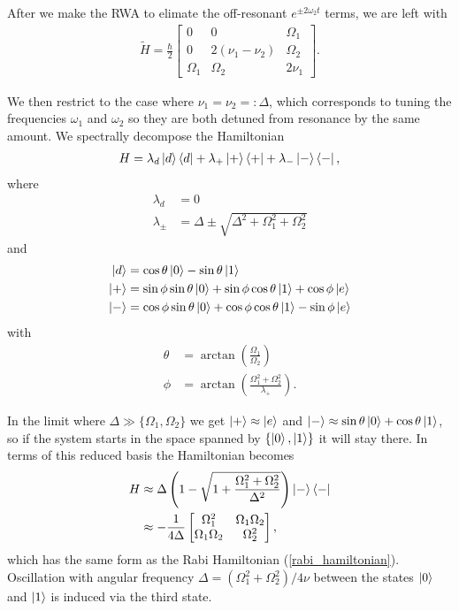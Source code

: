 After we make the RWA to elimate the off-resonant $e^{\pm2\omega_2 t}$ terms, we are left with 
\begin{align}
  \tilde{H}=\frac{\hbar}{2}
  \begin{bmatrix}
    0 & 0 & \Omega_1 \\
    0 & 2(\nu_1 - \nu_2) & \Omega_2  \\
    \Omega_1 & \Omega_2  & 2\nu_1
  \end{bmatrix}.
\end{align}

We then restrict to the case where $\nu_1 = \nu_2 =: \Delta$, which corresponds to tuning the frequencies $\omega_1$ and $\omega_2$ so they are both detuned from resonance by the same amount. We spectrally decompose the Hamiltonian
\begin{align}
  H = \lambda_d \left\vert d\right\rangle\left\langle d\right\vert + \lambda_{+}\left\vert+\right\rangle\left\langle +\right\vert + \lambda_{-}\left\vert-\right\rangle\left\langle -\right\vert,
\end{align}
where 
\begin{align}
  \lambda_d &= 0 \\
  \lambda_\pm &= \Delta \pm \sqrt{\Delta^2 + \Omega_1^2 + \Omega_2^2}
\end{align}
and
\begin{align}
  \ket{d} &%
  =\cos\theta \ket{0} - \sin\theta\ket{1} \\
  \ket{+} &%
  =\sin\phi \sin\theta \ket{0} + \sin\phi \cos\theta\ket{1}  + \cos\phi\ket{e}\\
  \ket{-} &%
  =\cos\phi \sin\theta \ket{0} + \cos\phi \cos\theta\ket{1}  - \sin\phi\ket{e}
\end{align}
with
\begin{align}
  \theta &= \arctan\left(\frac{\Omega_1}{\Omega_2}\right)\\
  \phi &= \arctan\left(\frac{\Omega_1^2 + \Omega_2^2}{\lambda_{+}}\right).
\end{align}

In the limit where $\Delta \gg \{\Omega_1, \Omega_2\}$ we get $\left\vert+\right\rangle \approx \left\vert e\right\rangle$ and $\left\vert-\right\rangle \approx \sin\theta\left\vert0\right\rangle + \cos\theta\left\vert1\right\rangle$, so if the system starts in the space spanned by $\{\left\vert0\right\rangle, \left\vert1\right\rangle\}$ it will stay there. In terms of this reduced basis the Hamiltonian becomes
\begin{align}
  H &\approx \Delta\left(1 - \sqrt{1 + \frac{\Omega_1^2 + \Omega_2^2}{\Delta^2}}\right)\left\vert-\right\rangle\left\langle -\right\vert \\
   &\approx -\frac{1}{4\Delta}
  \begin{bmatrix}
    \Omega_1^2 & \Omega_1 \Omega_2 \\
    \Omega_1\Omega_2 & \Omega_2^2
  \end{bmatrix},
\end{align}
which has the same form as the Rabi Hamiltonian (\ref{rabi_hamiltonian}). Oscillation with angular frequency $\Delta = (\Omega_1^2 + \Omega_2^2)/4\nu$ between the states $\left\vert0\right\rangle$ and $\left\vert1\right\rangle$ is induced via the third state.


